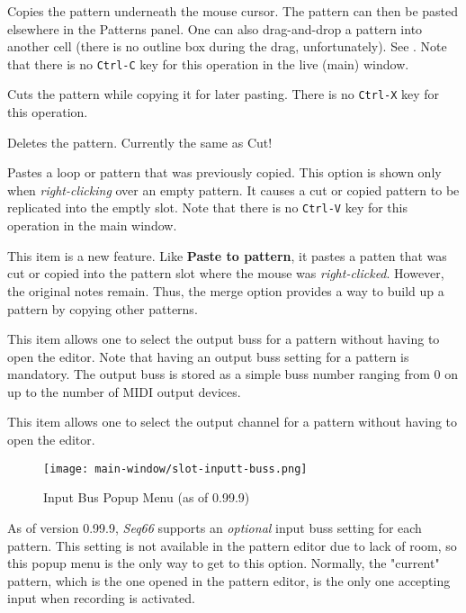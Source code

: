    Copies the pattern underneath the mouse cursor.
   The pattern can then be pasted elsewhere in the Patterns panel.
   One can also drag-and-drop a pattern into another cell (there is no outline
   box during the drag, unfortunately).
   See .
   Note that there is no \texttt{Ctrl-C} key for this operation in the
   live (main) window.

   Cuts the pattern while copying it for later pasting.
   There is no \texttt{Ctrl-X} key for this operation.

   Deletes the pattern.  Currently the same as Cut!

   Pastes a loop or pattern that was previously copied.
   This option is shown only when
   \textsl{right-clicking} over an empty pattern.
   It causes a cut or copied pattern to be replicated into the emptly slot.
   Note that there is no \texttt{Ctrl-V} key for this operation in the
   main window.

   This item is a new feature.  Like \textbf{Paste to pattern}, it pastes a
   patten that was cut or copied into the pattern slot where the mouse was
   \textsl{right-clicked}.  However, the original notes remain.  Thus, the merge
   option provides a way to build up a pattern by copying other patterns.

   This item allows one to select the output buss for a pattern without having
   to open the editor.
   Note that having an output buss setting for a pattern is mandatory.
   The output buss is stored as a simple buss number ranging from 0 on up to
   the number of MIDI output devices.

   This item allows one to select the output channel for a pattern without
   having to open the editor.

\begin{figure}[H]
   \centering 
   \texttt{[image: main-window/slot-inputt-buss.png]}
   \caption{Input Bus Popup Menu (as of 0.99.9)}
   \label{fig:slot_input_bus}
\end{figure}

   As of version 0.99.9, \textsl{Seq66} supports an
   \textsl{optional} input buss setting for each pattern.
   This setting is not available in the pattern editor due to lack
   of room, so this popup menu is the only way to get to this option.
   Normally, the "current" pattern, which is the one opened in
   the pattern editor, is the only one accepting input when
   recording is activated.

